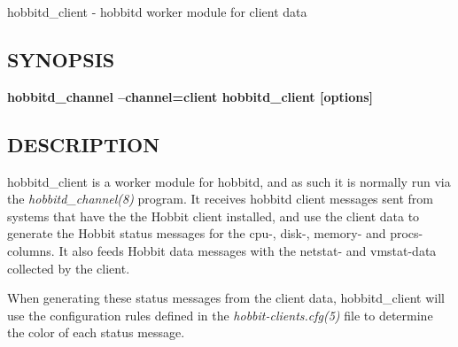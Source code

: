  hobbitd\_client - hobbitd worker module for client data 
\subsection{SYNOPSIS}
\textbf{hobbitd\_channel --channel=client hobbitd\_client [options]}


 
\subsection{DESCRIPTION}
 hobbitd\_client is a worker module for hobbitd, and as such it is normally run via the \emph{hobbitd\_channel(8)}
 program. It receives hobbitd client messages sent from systems that have the the Hobbit client installed, and use the client data to generate the Hobbit status messages for the cpu-, disk-, memory- and procs-columns. It also feeds Hobbit data messages with the netstat- and vmstat-data collected by the client. 

  When generating these status messages from the client data, hobbitd\_client will use the configuration rules defined in the \emph{hobbit-clients.cfg(5)}
 file to determine the color of each status message. 


 
